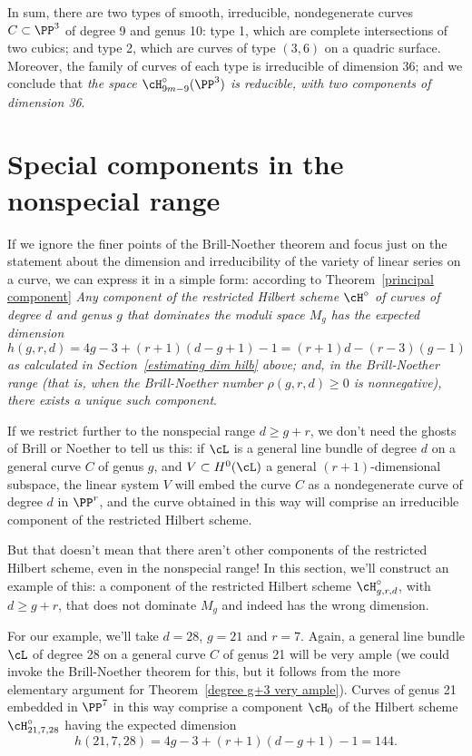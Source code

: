 In sum, there are two types of smooth, irreducible, nondegenerate curves $C \subset \PP^3$ of degree 9 and genus 10: type 1, which are complete intersections of two cubics; and type 2, which are curves of type $(3,6)$ on a quadric surface. Moreover, the family of curves of each type is irreducible of dimension 36; and we conclude that \emph{the space $\cH^\circ_{9m-9}(\PP^3)$ is reducible, with two components of dimension 36}.


 \section{Special components in the nonspecial range}

If we ignore the finer points of the Brill-Noether theorem and focus just on the statement about the dimension and irreducibility of the variety of linear series on a curve, we can express it in a simple form: according to Theorem~\ref{principal component} \emph{Any component of the restricted Hilbert scheme $\cH^\circ$ of curves of degree $d$ and genus $g$ that dominates the moduli space $M_g$ has the expected dimension 
$$
h(g,r,d) = 4g-3 + (r+1)(d-g+1) - 1 = (r+1)d - (r-3)(g-1)
$$
 as calculated in Section~\ref{estimating dim hilb} above; and, in the Brill-Noether range (that is, when the Brill-Noether number $\rho(g,r,d) \geq 0$ is nonnegative), there exists a unique such component}.
 
If we restrict further to the nonspecial range $d \geq g + r$, we don't need the ghosts of Brill or Noether to tell us this: if $\cL$ is a general line bundle of degree $d$ on a general curve $C$ of genus $g$, and $V \subset H^0(\cL)$ a general $(r+1)$-dimensional subspace, the linear system $V$ will embed the curve $C$ as a nondegenerate curve of degree $d$ in $\PP^{r}$, and the curve obtained in this way will comprise an irreducible component of the restricted Hilbert scheme.

But that doesn't mean that there aren't other components of the restricted Hilbert scheme, even in the nonspecial range! In this section, we'll construct an example of this: a component of the restricted Hilbert scheme $\cH^\circ_{g,r,d}$, with $d \geq g+r$, that does not dominate $M_g$ and indeed has the wrong dimension.

For our example, we'll take $d = 28$, $g = 21$ and $r=7$. Again, a general line bundle $\cL$ of degree 28 on a general curve $C$ of genus 21 will be very ample (we could invoke the Brill-Noether theorem for this, but it follows from the more elementary argument for Theorem~\ref{degree g+3 very ample}). Curves of genus 21 embedded in $\PP^7$ in this way comprise a component $\cH_0$ of the Hilbert scheme $\cH^\circ_{21, 7, 28}$ having the expected dimension
$$
h(21, 7, 28) = 4g-3 + (r+1)(d-g+1) - 1 = 144.
$$

